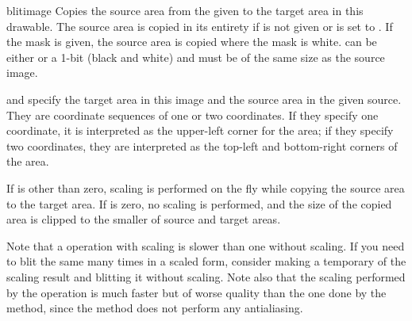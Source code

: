\begin{methoddesc}{blit}{image}
Copies the source area from the given  to the target area in 
this drawable. The source area is copied in its entirety if  is 
not given or is set to . If the mask is given, the source area 
is copied where the mask is white.  can be either  
or a 1-bit (black and white)  and must be of the same size as 
the source image.

 and  specify the target area in this image 
and the source area in the given source. They are coordinate sequences of 
one or two coordinates. If they specify one coordinate, it is interpreted as 
the upper-left corner for the area; if they specify two coordinates, they 
are interpreted as the top-left and bottom-right corners of the area.

If  is other than zero, scaling is performed on the fly while 
copying the source area to the target area. If  is zero, no 
scaling is performed, and the size of the copied area is clipped to the 
smaller of source and target areas.

Note that a  operation with scaling is slower than one without 
scaling. If you need to blit the same  many times in a scaled 
form, consider making a temporary  of the scaling result and 
blitting it without scaling. Note also that the scaling performed by the 
 operation is much faster but of worse quality than the one 
done by the  method, since the  method does not 
perform any antialiasing.
\end{methoddesc}
